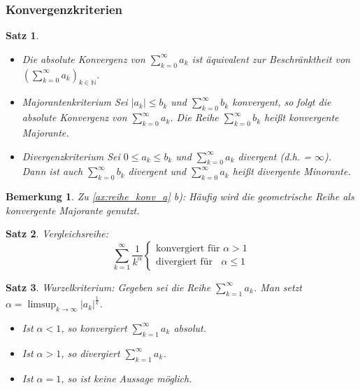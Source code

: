 \documentclass[12pt,a4paper]{report}%
\newtheorem{satz}{Satz}[section]
\newtheorem{bem}{Bemerkung}[section]
\numberwithin{equation}{section}
\newcommand{\N}{\mathbb{N}}
\numberwithin{equation}{subsection}
\begin{document}
	  \subsubsection{Konvergenzkriterien}
	  \begin{satz}
	    \begin{itemize}
	      \item[a) ] Die absolute Konvergenz von $\sum\limits_{k=0}^\infty a_k$ ist äquivalent zur Beschränktheit von $\left(\sum\limits_{k=0}^\infty a_k \right)_{k\in \N}$.
	      \item[b) ] Majorantenkriterium \newline
	      Sei $|a_k| \leq b_k$ und $\sum\limits_{k=0}^\infty b_k$ konvergent, so folgt die absolute Konvergenz von $\sum\limits_{k=0}^\infty a_k$. Die Reihe $\sum\limits_{k=0}^\infty b_k$ heißt konvergente Majorante. 
	      \item[c) ] Divergenzkriterium \newline
	      Sei $0 \leq a_k \leq b_k$ und $\sum\limits_{k=0}^\infty a_k$ divergent (d.h. = $\infty$). Dann ist auch $\sum\limits_{k=0}^\infty b_k$ divergent und $\sum\limits_{k=0}^\infty a_k$ heißt divergente Minorante.
	    \end{itemize} \label{ax:reihe_konv_a}
	  \end{satz}
	  \begin{bem}
	    Zu \eqref{ax:reihe_konv_a} b): Häufig wird die geometrische Reihe als konvergente Majorante genutzt.
	  \end{bem}
	  \begin{satz}
	    Vergleichsreihe:
	    \begin{equation}
	      \sum\limits_{k = 1}^\infty \frac{1}{k^\alpha} 
	      \begin{cases}
	        \text{konvergiert für }\alpha > 1 \\
	        \text{divergiert für  }\;\;\alpha \leq 1
	      \end{cases}
	    \end{equation}
	  \end{satz}
	  \begin{satz}
	    Wurzelkriterium: Gegeben sei die Reihe $\sum\limits_{k=1}^\infty a_k$. Man setzt $\alpha = \limsup_{k \rightarrow \infty} |a_k|^{\frac{1}{k}}$.
	    \begin{itemize}
	      \item[a) ] Ist $\alpha < 1$, so konvergiert $\sum\limits_{k=1}^\infty a_k$ absolut.
	      \item[b) ] Ist $\alpha > 1$, so divergiert $\sum\limits_{k=1}^\infty a_k$.
	      \item[c) ] Ist $\alpha = 1$, so ist keine Aussage möglich.
	    \end{itemize}\label{ax:folgen_konv_wurzel}
	  \end{satz}
\end{document}
